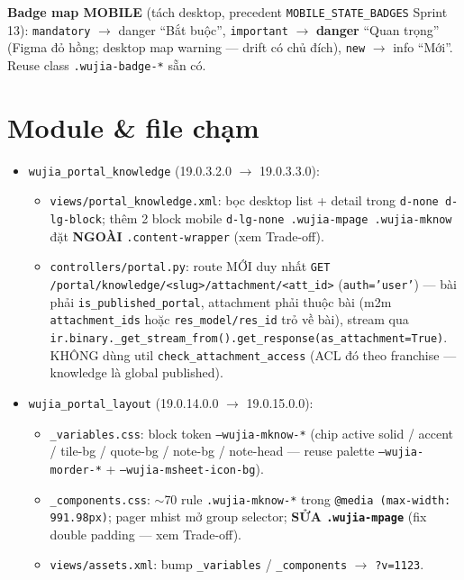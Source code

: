 \textbf{Badge map MOBILE} (tách desktop, precedent \texttt{MOBILE\_STATE\_BADGES}
Sprint 13): \texttt{mandatory} \(\rightarrow\) danger ``Bắt buộc'',
\texttt{important} \(\rightarrow\) \textbf{danger} ``Quan trọng'' (Figma đỏ hồng;
desktop map warning --- drift có chủ đích), \texttt{new} \(\rightarrow\) info ``Mới''.
Reuse class \texttt{.wujia-badge-*} sẵn có.

\section{Module \& file chạm}

\begin{itemize}
  \item \texttt{wujia\_portal\_knowledge} (19.0.3.2.0 \(\rightarrow\) 19.0.3.3.0):
    \begin{itemize}
      \item \texttt{views/portal\_knowledge.xml}: bọc desktop list + detail trong
            \texttt{d-none d-lg-block}; thêm 2 block mobile \texttt{d-lg-none
            .wujia-mpage .wujia-mknow} đặt \textbf{NGOÀI} \texttt{.content-wrapper}
            (xem Trade-off).
      \item \texttt{controllers/portal.py}: route MỚI duy nhất
            \texttt{GET /portal/knowledge/<slug>/attachment/<att\_id>}
            (\texttt{auth='user'}) --- bài phải \texttt{is\_published\_portal},
            attachment phải thuộc bài (m2m \texttt{attachment\_ids} hoặc
            \texttt{res\_model/res\_id} trỏ về bài), stream qua
            \texttt{ir.binary.\_get\_stream\_from().get\_response(as\_attachment=True)}.
            KHÔNG dùng util \texttt{check\_attachment\_access} (ACL đó theo franchise
            --- knowledge là global published).
    \end{itemize}
  \item \texttt{wujia\_portal\_layout} (19.0.14.0.0 \(\rightarrow\) 19.0.15.0.0):
    \begin{itemize}
      \item \texttt{\_variables.css}: block token \texttt{--wujia-mknow-*} (chip
            active solid / accent / tile-bg / quote-bg / note-bg / note-head ---
            reuse palette \texttt{--wujia-morder-*} + \texttt{--wujia-msheet-icon-bg}).
      \item \texttt{\_components.css}: \(\sim\)70 rule \texttt{.wujia-mknow-*} trong
            \texttt{@media (max-width: 991.98px)}; pager mhist mở group selector;
            \textbf{SỬA \texttt{.wujia-mpage}} (fix double padding --- xem Trade-off).
      \item \texttt{views/assets.xml}: bump \texttt{\_variables} / \texttt{\_components}
            \(\rightarrow\) \texttt{?v=1123}.
    \end{itemize}
\end{itemize}

